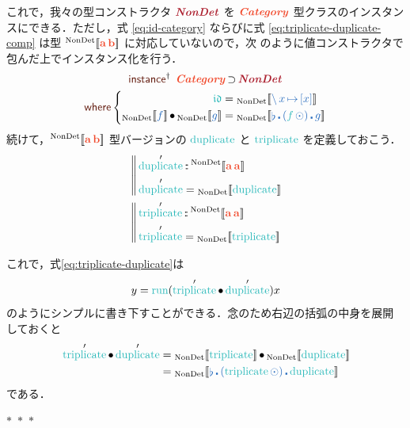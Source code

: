 \documentclass[a5paper,twoside,fleqn,draft]{jsbook}
\def\[{[\![}
\def\]{]\!]}
\def\keywordColor{Sepia}
\def\varColor{NavyBlue}
\def\funcColor{BlueGreen}
\def\typeColor{RedOrange}
\def\typeConstColor{Maroon}
\newcommand{\separator}{\begin{center}$*$~$*$~$*$\end{center}}
\newcommand{\mBrace}{\Vert}
\newcommand{\mKeyword}[1]{\textcolor{\keywordColor}{\mathsf{#1}}}
\newcommand{\mInstanceDeclKeyword}{\mKeyword{instance}}
\newcommand{\mWhereKeyword}{\mKeyword{where}}
\newcommand{\mPolymorphic}[1]{{#1}^\dagger}
\newcommand{\mTypeConstructor}[1]{\textcolor{\typeConstColor}{\textbf{\textit{#1}}}}
\DeclareMathOperator{\mInstanceDeclPolymorphic}{\mPolymorphic{\mInstanceDeclKeyword}}
\DeclareMathOperator{\mSuperSet}{\supset}
\DeclareMathOperator{\mWhere}{\mWhereKeyword}
\newcommand{\mVar}[1]{\textcolor{\varColor}{#1}}
\newcommand{\mFunc}[1]{\textcolor{\funcColor}{#1}}
\newcommand{\mSpecialFunc}[1]{\textcolor{\funcColor}{\textrm{#1}}}
\newcommand{\mVarSpecialFunc}[1]{\textcolor{\funcColor}{\mathfrak{#1}}}
\newcommand{\mFFunc}{{\mFunc{f}}}
\DeclareMathOperator{\mDuplicate}{\mSpecialFunc{duplicate}}
\DeclareMathOperator{\mIdCat}{\mVarSpecialFunc{id}}
\DeclareMathOperator{\mRun}{\mSpecialFunc{run}}
\DeclareMathOperator{\mTriplicate}{\mSpecialFunc{triplicate}}
\DeclareMathOperator{\mCompFunc}{\centerdot}
\DeclareMathOperator{\mCompCat}{\bullet}
\DeclareMathOperator{\mIn}{{:\!:}}
\DeclareMathOperator{\mJoinList}{\flat} %
\DeclareMathOperator{\mLambda}{\backslash}
\DeclareMathOperator{\mLambdaArrow}{\mapsto}
\DeclareMathOperator{\mMapList}{\odot}
\newcommand{\mType}[1]{\textcolor{\typeColor}{\mathbf{#1}}}
\newcommand{\mA}{\mType{a}}
\newcommand{\mB}{\mType{b}}
\newcommand{\mTypeAssemble}[2]{{}^\mathrm{#1}\[\mType{#2}\]}
\newcommand{\mValueConstructor}[1]{\mathrm{#1}}
\newcommand{\mValueWith}[2]{{}_\mValueConstructor{#1}\[\mVar{#2}\]}
\newcommand{\mTypeClass}[1]{\textcolor{\typeColor}{\textbf{\textit{#1}}}}
\newcommand{\mCatTypeClass}{\mTypeClass{Category}}
\newcommand{\mLambdaEXP}[2]{\mLambda{#1}\mLambdaArrow{#2}} %
\begin{document}
これで，我々の型コンストラクタ $\mTypeConstructor{NonDet}$ を
$\mCatTypeClass$ 型クラスのインスタンスにできる．ただし，式
\eqref{eq:id-category} ならびに式 \eqref{eq:triplicate-duplicate-comp}
は型 $\mTypeAssemble{NonDet}{\mA\,\mB}$ に対応していないので，次
のように値コンストラクタで包んだ上でインスタンス化を行う．
\begin{multline}
  \label{eq:nondet-instance}
  \mInstanceDeclPolymorphic\;
  \mTypeClass{Category}\mSuperSet\mTypeConstructor{NonDet}\\
  \mWhere\left\{
  \begin{aligned}
    \mIdCat
    &=\mValueWith{NonDet}{\mLambdaEXP{x}{[x]}}\\
    \mValueWith{NonDet}{f}\mCompCat\mValueWith{NonDet}{g}
    &=\mValueWith{NonDet}{\mJoinList\mCompFunc{}(\mFFunc\mMapList)\mCompFunc g}
  \end{aligned}
  \right.
\end{multline}
続けて，$\mTypeAssemble{NonDet}{\mA\,\mB}$ 型バージョンの
$\mDuplicate$ と $\mTriplicate$ を定義しておこう．
\begin{align}
  &\left\mBrace
  \begin{aligned}
    &\mDuplicate'
    \mIn\mTypeAssemble{NonDet}{\mA\,\mA}\\
    &\mDuplicate'
    =\mValueWith{NonDet}{\mDuplicate}
  \end{aligned}
  \right.\\
  &\left\mBrace
  \begin{aligned}
    &\mTriplicate'
    \mIn\mTypeAssemble{NonDet}{\mA\,\mA}\\
    &\mTriplicate'
    =\mValueWith{NonDet}{\mTriplicate}
  \end{aligned}
  \right.
\end{align}

これで，式\eqref{eq:triplicate-duplicate}は
\begin{equation}
  y=\mRun(\mTriplicate'\mCompCat\mDuplicate')x
\end{equation}
のようにシンプルに書き下すことができる．念のため右辺の括弧の中身を展開
しておくと
\begin{align}
  \mTriplicate'\mCompCat\mDuplicate'
  &=\mValueWith{NonDet}{\mTriplicate}\mCompCat\mValueWith{NonDet}{\mDuplicate}\\
  &=\mValueWith{NonDet}{\mJoinList\mCompFunc{}(\mTriplicate\mMapList)\mCompFunc\mDuplicate}
\end{align}
である．

\separator
\end{document}
